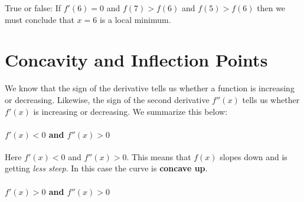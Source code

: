 \documentclass{ximera}
\begin{document}
\begin{question}
True or false: If $f'(6)=0$ and $f(7)>f(6)$ and $f(5)>f(6)$ then we
must conclude that $x=6$ is a local minimum.
    \begin{multipleChoice}
    \end{multipleChoice}  
\end{question}




\section*{Concavity and Inflection Points}

We know that the sign of the derivative tells us whether a function is
increasing or decreasing. Likewise, the sign of the second derivative
$f''(x)$ tells us whether $f'(x)$ is increasing or decreasing. We
summarize this below:


\paragraph{$f'(x)<0$ and $f''(x)>0$}

\begin{image}
\end{image}

Here $f'(x)<0$ and $f''(x)>0$. This means that $f(x)$ slopes down and
is getting \textit{less steep}. In this case the curve is
\textbf{concave up}.

\paragraph{$f'(x)>0$ and $f''(x)>0$}

\begin{image}
\end{image}
\end{document}
